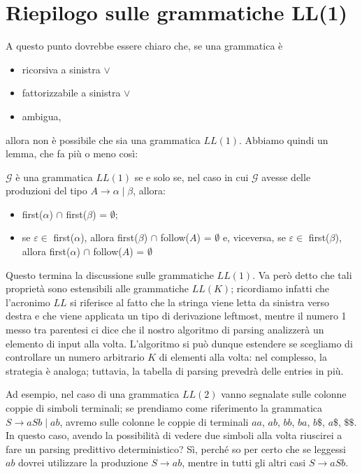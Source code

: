 \documentclass[class=book, crop=false, oneside, 12pt]{standalone}
\begin{document}
\section{Riepilogo sulle grammatiche LL(1)}
A questo punto dovrebbe essere chiaro che, se una grammatica è
\begin{itemize}
    \item ricorsiva a sinistra \(\lor\)
    \item fattorizzabile a sinistra \(\lor\)
    \item ambigua,
\end{itemize}
allora non è possibile che sia una grammatica \(LL(1)\). Abbiamo quindi un lemma, che fa più o meno così:
\begin{lemma}
    \(\mathcal{G}\) è una grammatica \(LL(1)\) se e solo se, nel caso in cui \(\mathcal{G}\) avesse delle produzioni del tipo \(A \rightarrow \alpha \mid \beta\), allora:
    \begin{itemize}
        \item first(\(\alpha\)) \(\cap\) first(\(\beta\)) = \(\emptyset\);
        \item se \(\varepsilon \in\) first(\(\alpha\)), allora first(\(\beta\)) \(\cap\) follow(\(A\)) = \(\emptyset\) e, viceversa, se \(\varepsilon \in\) first(\(\beta\)), allora first(\(\alpha\)) \(\cap\) follow(\(A\)) = \(\emptyset\)
    \end{itemize}
\end{lemma}
Questo termina la discussione sulle grammatiche \(LL(1)\). Va però detto che tali proprietà sono estensibili alle grammatiche \(LL(K)\); ricordiamo infatti che l'acronimo \(LL\) si riferisce al fatto che la stringa viene letta da sinistra verso destra e che viene applicata un tipo di derivazione leftmost, mentre il numero 1 messo tra parentesi ci dice che il nostro algoritmo di parsing analizzerà un elemento di input alla volta. L'algoritmo si può dunque estendere se scegliamo di controllare un numero arbitrario \(K\) di elementi alla volta: nel complesso, la strategia è analoga; tuttavia, la tabella di parsing prevedrà delle entries in più. 

Ad esempio, nel caso di una grammatica \(LL(2)\) vanno segnalate sulle colonne coppie di simboli terminali; se prendiamo come riferimento la grammatica \(S \rightarrow aSb \mid ab\), avremo sulle colonne le coppie di terminali \(aa\), \(ab\), \(bb\), \(ba\), \(b\$\), \(a\$\), \(\$\$\). In questo caso, avendo la possibilità di vedere due simboli alla volta riuscirei a fare un parsing predittivo deterministico? Sì, perché so per certo che se leggessi \(ab\) dovrei utilizzare la produzione \(S \rightarrow ab\), mentre in tutti gli altri casi \(S \rightarrow aSb\).
\end{document}
